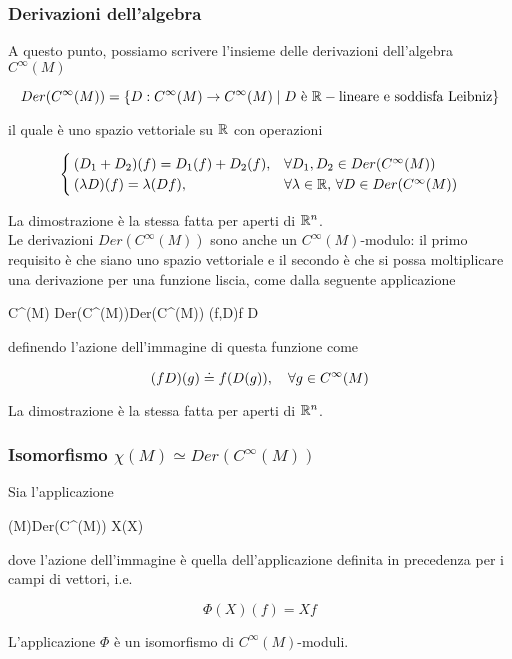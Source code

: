 \subsubsection{Derivazioni dell'algebra}

A questo punto, possiamo scrivere l'insieme delle derivazioni dell'algebra $ C^{\infty}(M) $

\begin{equation}
	Der(C^{\infty}(M)) = \{ D : C^{\infty}(M) \to C^{\infty}(M) \mid D \text{ è } \mathbb{R}-\text{lineare e soddisfa Leibniz} \}
\end{equation}

il quale è uno spazio vettoriale su $ \mathbb{R} $ con operazioni

\begin{equation}
	\begin{cases}
		(D_{1} + D_{2})(f) = D_{1}(f) + D_{2}(f), & \forall D_{1},D_{2} \in Der(C^{\infty}(M)) \\
		(\lambda D)(f) = \lambda (D f), & \forall \lambda \in \mathbb{R}, \, \forall D \in Der(C^{\infty}(M))
	\end{cases}
\end{equation}

La dimostrazione è la stessa fatta per aperti di $ \mathbb{R}^{n} $.\\
Le derivazioni $ Der(C^{\infty}(M)) $ sono anche un $ C^{\infty}(M) $-modulo: il primo requisito è che siano uno spazio vettoriale e il secondo è che si possa moltiplicare una derivazione per una funzione liscia, come dalla seguente applicazione

	{C^{\infty}(M) \times Der(C^{\infty}(M))}{Der(C^{\infty}(M))}
	{(f,D)}{f D}

definendo l'azione dell'immagine di questa funzione come

\begin{equation}
	(f D)(g) \doteq f (D(g)) \qcomma \forall g \in C^{\infty}(M)
\end{equation}

La dimostrazione è la stessa fatta per aperti di $ \mathbb{R}^{n} $.

\subsubsection{Isomorfismo $ \chi(M) \simeq Der(C^{\infty}(M)) $}

\begin{theorem}
	Sia l'applicazione
	
	\map{\Phi}
		{\chi(M)}{Der(C^{\infty}(M))}
		{X}{\Phi(X)}

	dove l'azione dell'immagine è quella dell'applicazione definita in precedenza per i campi di vettori, i.e.
	
	\begin{equation}
		\Phi(X)(f) = X f
	\end{equation}

	L'applicazione $ \Phi $ è un isomorfismo di $ C^{\infty}(M) $-moduli.
\end{theorem}

